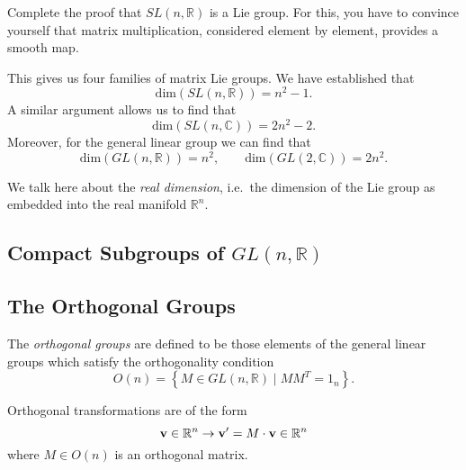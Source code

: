 \begin{exercise}
  Complete the proof that $SL(n, \mathbb{R})$ is a Lie group. For this, you have to convince yourself that matrix multiplication, considered element by element, provides a smooth map.
\end{exercise}

This gives us four families of matrix Lie groups.
We have established that
\begin{equation}
  \text{dim}(SL(n, \mathbb{R})) = n^2 - 1.
\end{equation}
A similar argument allows us to find that
\begin{equation}
  \text{dim}(SL(n, \mathbb{C})) = 2n^2 - 2.
\end{equation}
Moreover, for the general linear group we can find that
\begin{equation}
  \text{dim}(GL(n, \mathbb{R})) = n^2, \qquad \text{dim}(GL(2, \mathbb{C})) = 2n^2.
\end{equation}
\begin{leftbar}
  \begin{remark}
    We talk here about the \emph{real dimension}, i.e.~the dimension of the Lie group as embedded into the real manifold $\mathbb{R}^n$.
  \end{remark}
\end{leftbar}

\subsection{Compact Subgroups of \texorpdfstring{$GL(n, \mathbb{R})$}{GL(n, R)}}%
\label{sub:subgroup_of_gl_n_r}

\subsection*{The Orthogonal Groups}%

\begin{definition}
  The \emph{orthogonal groups} are defined to be those elements of the general linear groups which satisfy the orthogonality condition
  \begin{equation}
    O(n) = \left\{ M \in GL(n, \mathbb{R}) \mid M M^T = 1_n \right\}.
  \end{equation}
\end{definition}

\begin{definition}
Orthogonal transformations are of the form
\begin{equation}
  \vb{v} \in \mathbb{R}^n \to \vb{v}' = M \cdot \vb{v} \in \mathbb{R}^n
\end{equation}
  where $M \in O(n)$ is an orthogonal matrix.
\end{definition}

